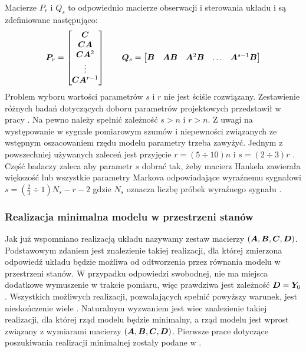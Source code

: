 Macierze $P_r$ i $Q_s$ to odpowiednio macierze obserwacji i sterowania układu i są zdefiniowane następująco:
\begin{equation}
	\bm{P}_r = \begin{bmatrix}
		\bm{C} \\ 
		\bm{CA} \\
		\bm{CA}^2\\
		\vdots \\
		\bm{CA}^{r-1}\\
	\end{bmatrix}
	\qquad
	\bm{Q}_s = \begin{bmatrix}
		\bm{B} & \bm{AB} & \bm{A}^2\bm{B} & \dots & \bm{A}^{s-1}\bm{B}    
	\end{bmatrix}	
\end{equation}
Problem wyboru wartości parametrów $s$ i $r$ nie jest ściśle rozwiązany. Zestawienie różnych badań dotyczących doboru parametrów projektowych przedstawił w pracy \cite{Szafranski2013}. Na pewno należy spełnić zależność $s>n$ i $r>n$. Z uwagi na występowanie w sygnale pomiarowym szumów i niepewności związanych ze wstępnym oszacowaniem rzędu modelu parametry trzeba zawyżyć. Jednym z powszechniej używanych zaleceń jest przyjęcie $r=(5\div10)n$ i $s=(2\div3)r$ \parencite{Dudek2008}. Część badaczy zaleca aby parametr $s$ dobrać tak, żeby macierz Hankela zawierała większość lub wszystkie parametry Markova odpowiadające wyraźnemu sygnałowi $s = (\frac{2}{3}\div 1)N_s-r-2$ gdzie $N_s$ oznacza liczbę próbek wyraźnego sygnału \parencite{Caicedo2011,Nayeri2009}.

\subsubsection{Realizacja minimalna modelu w przestrzeni stanów}

Jak już wspomniano realizacją układu nazywamy zestaw macierzy $(\bm{A},\bm{B},\bm{C},\bm{D})$. Podstawowym zdaniem jest znalezienie takiej realizacji, dla której zmierzona odpowiedź układu będzie możliwa od odtworzenia przez równania modelu w przestrzeni stanów. W przypadku odpowiedzi swobodnej, nie ma miejsca dodatkowe wymuszenie w trakcie pomiaru, więc prawdziwa jest zależność $\bm{D}=\bm{Y}_0$. Wszystkich możliwych realizacji, pozwalających spełnić powyższy warunek, jest nieskończenie wiele \parencite{Juang1985}. Naturalnym wyzwaniem jest wiec znalezienie takiej realizacji, dla której rząd modelu będzie minimalny, a rząd modelu jest wprost związany z wymiarami macierzy $(\bm{A},\bm{B},\bm{C},\bm{D})$. Pierwsze prace dotyczące poszukiwania realizacji minimalnej zostały podane w \parencite{Kalman1963,Ho1966}.

